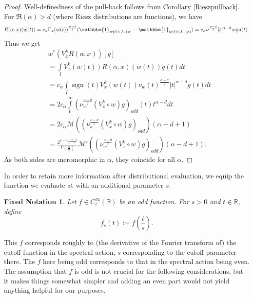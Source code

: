 \documentclass[11pt]{article}
\def\R{{\mathbb{R}}}
\def\intP{\int\limits_0^\infty}
\def\M{\mathcal{M}}
\newtheorem{gn}[df]{Fixed Notation}
\DeclareMathOperator{\sign}{sign}
\begin{document}
\begin{proof}
	Well-definedness of the pull-back follows from Corollary \ref{Rieszpullback}.
	For $\Re(\alpha)>d$ (where Riesz distributions are functions), we have
	\[R(\alpha,x)(w(t))=c_\alpha \Gamma_x(w(t))^\frac{\alpha-d}{2}(\mathbbm{1}_{w(t)\in J_+(x)}-\mathbbm{1}_{w(t)\in J_-(x)})=c_\alpha \nu^\frac{\alpha-d}{2} |t|^{\alpha-d}\sign(t).\]
	Thus we get
	\begin{align*}
		&w^*({V^k_x}R(\alpha,x))[g]\\
		&=\int\limits_I {V^k_x}(w(t))R(\alpha,x)(w(t))g(t)dt\\
		&=c_{\alpha}\int\limits_I \sign(t){V^k_x}(w(t))\nu_w(t)^\frac{\alpha-d}{2}|t|^{\alpha-d}g(t)dt\\
		&=2c_\alpha\intP\left(\nu_w^\frac{\alpha-d}{2}({V^k_x}\circ w)g\right)_{odd}(t) t^{\alpha-d}dt\\
		&=2c_\alpha \M\left(\left(\nu_w^\frac{\alpha-d}{2}({V^k_x}\circ w)g\right)_{odd}\right)({\alpha-d+1})\\
		&=\frac{2^{2-\alpha}\pi^\frac{2-d}{2}}{\Gamma(\frac{\alpha}{2})} \M'\left(\left(\nu_w^\frac{\alpha-d}{2}({V^k_x}\circ w)g\right)_{odd}\right)({\alpha-d+1}).
	\end{align*}
	As both sides are meromorphic in $\alpha$, they coincide for all $\alpha$.
\end{proof}
In order to retain more information after distributional evaluation, we equip the function we evaluate at with an additional parameter $s$.
\begin{gn}
	\label{dff}
	Let $f\in C_c^\infty(\R)$ be an odd function. For $s>0$ and $t\in \R$, define \[f_s(t):=f\left(\frac{t}{s}\right).\] 
\end{gn}
This $f$ corresponds roughly to (the derivative of the Fourier transform of) the cutoff function in the spectral action, $s$ corresponding to the cutoff parameter there. The $f$ here being odd corresponds to that in the spectral action being even.
The assumption that $f$ is odd is not crucial for the following considerations, but it makes things somewhat simpler and adding an even part would not yield anything helpful for our purposes.
\end{document}
